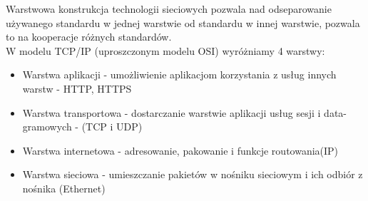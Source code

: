 Warstwowa konstrukcja technologii sieciowych pozwala nad odseparowanie używanego standardu w jednej warstwie od standardu w innej warstwie, pozwala to na kooperacje różnych standardów. \\ 
W modelu TCP/IP (uproszczonym modelu OSI) wyróżniamy 4 warstwy:
\begin{itemize}
    \item Warstwa aplikacji - umożliwienie aplikacjom korzystania z usług innych warstw - HTTP, HTTPS
    \item Warstwa transportowa - dostarczanie warstwie aplikacji usług sesji i data-gramowych - (TCP i UDP)
    \item Warstwa internetowa - adresowanie, pakowanie i funkcje routowania(IP)
    \item Warstwa sieciowa - umieszczanie pakietów w nośniku sieciowym i ich odbiór z nośnika (Ethernet)
\end{itemize}